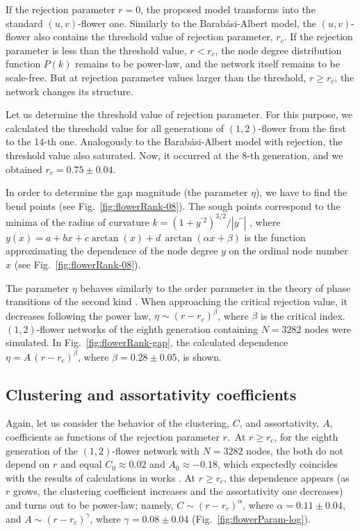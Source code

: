 \documentclass[aps,preprint]{revtex4}%
\begin{document}
If the rejection parameter $r=0$, the proposed model transforms into the
standard $(u,v)$-flower one. Similarly to the Barab\'{a}si-Albert model, the
$(u,v)$-flower also contains the threshold value of rejection parameter,
$r_{c}$. If the rejection parameter is less than the threshold value,
$r<r_{c}$, the node degree distribution function $P(k)$ remains to be
power-law, and the network itself remains to be scale-free. But at rejection
parameter values larger than the threshold, $r\geq r_{c}$, the network changes
its structure.

Let us determine the threshold value of rejection parameter. For this purpose,
we calculated the threshold value for all generations of $(1,2)$-flower from
the first to the 14-th one. Analogously to the Barab\'{a}si-Albert model with
rejection, the threshold value also saturated. Now, it occurred at the 8-th
generation, and we obtained $r_{c}=0.75\pm0.04$.

In order to determine the gap magnitude (the parameter $\eta$), we have to
find the bend points (see Fig.~\ref{fig:flowerRank-08}). The sough points
correspond to the minima of the radius of curvature $k=\left(  1+y^{\prime}%
{}^{2}\right)  ^{3/2}/|y^{\prime\prime}|$ \cite{Hazewinkel}, where
$y(x)=a+bx+\dot{c}\arctan(x)+d\,\arctan(\alpha x+\beta)$ is the function
approximating the dependence of the node degree $y$ on the ordinal node number
$x$ \cite{Mills} (see Fig.~\ref{fig:flowerRank-08}).

The parameter $\eta$ behaves similarly to the order parameter in the theory of
phase transitions of the second kind \cite{Landau}. When approaching the
critical rejection value, it decreases following the power law, $\eta
\sim(r-r_{c})^{\beta}$, where $\beta$ is the critical index. $(1,2)$-flower
networks of the eighth generation containing $N=3282$ nodes were simulated. In
Fig.~\ref{fig:flowerRank-gap}, the calculated dependence $\eta=A\,{(r-r_{c}%
)}^{\beta}$, where $\beta=0.28\pm0.05$, is shown.

\subsection{Clustering and assortativity coefficients}

Again, let us consider the behavior of the clustering, $C$, and assortativity,
$A$, coefficients as functions of the rejection parameter $r$.\ At $r\geq
r_{c}$, for the eighth generation of the $(1,2)$-flower network with $N=3282$
nodes, the both do not depend on $r$ and equal $C_{0}\approx0.02$ and
$A_{0}\approx-0.18$, which expectedly coincides with the results of
calculations in works \cite{Rozenfeld1,Rozenfeld2}. At $r\geq r_{c}$, this
dependence appears (as $r$ grows, the clustering coefficient increases and the
assortativity one decreases) and turns out to be power-law; namely,
$C\sim{(r-r_{c})}^{\alpha}$, where $\alpha=0.11\pm0.04$, and $A\sim{(r-r_{c}%
)}^{\gamma}$, where $\gamma=0.08\pm0.04$ (Fig.~\ref{fig:flowerParam-log}).
\end{document}
